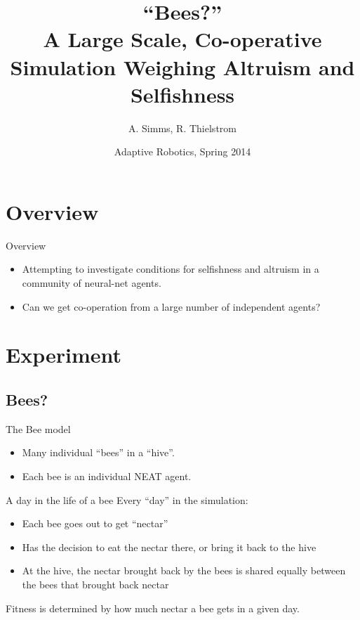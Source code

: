 \documentclass{beamer}
\title[Bees?]{``Bees?''\\ A Large Scale, Co-operative Simulation Weighing
                          Altruism and Selfishness}
\author{A. Simms, R. Thielstrom}
\institute{Swarthmore College}
\date{Adaptive Robotics, Spring 2014}
\begin{document}
    \begin{frame}
        \titlepage
    \end{frame}

    \begin{frame}
        \tableofcontents
    \end{frame}


    \section{Overview}

    \begin{frame}{Overview}
        \begin{itemize}
            \item Attempting to investigate conditions for selfishness and altruism in a community
                  of neural-net agents.
            \item Can we get co-operation from a large number of independent agents?
        \end{itemize}
    \end{frame}

    \section{Experiment}

    \subsection{Bees?}
    \begin{frame}{The Bee model}
        \begin{itemize}
            \item Many individual ``bees'' in a ``hive''.
            \item Each bee is an individual NEAT agent.
        \end{itemize}
    \end{frame}

    \begin{frame}{A day in the life of a bee}
        Every ``day'' in the simulation:
        \begin{itemize}
            \item Each bee goes out to get ``nectar''
            \item Has the decision to eat the nectar there, or bring it back to the hive
            \item At the hive, the nectar brought back by the bees is shared equally between 
                  the bees that brought back nectar
        \end{itemize}
        Fitness is determined by how much nectar a bee gets in a given day.
    \end{frame}
\end{document}
